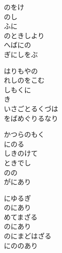 \documentclass[10pt,b5j]{tarticle} %
\begin{document}
\vspace{1.5em} %
\newcommand{\linespace}{0.5em} %
\newcommand{\blocksize}{0.5\hsize} %
\begin{enumerate} %
    \begin{minipage}[c]{\blocksize}
    
        \vspace{\linespace}
        \item
        のをけ\\
        のし\\
        ふに\\
        のときしより\\
        へばにの\\
        ぎにしをぶ
        
        \vspace{\linespace}
        \item
        はりもやの\\
        れしのをこむ\\
        しもくに\\
        き\\
        いさごとるくづは\\
        をばめぐりるなり
        
        \vspace{\linespace}
        \item
        かつらのもく\\
        にのる\\
        しきのけて\\
        ときでし\\
        のの\\
        がにあり
        
        \vspace{\linespace}
        \item
        にゆるぎ\\
        のにあり\\
        めてまざる\\
        のにあり\\
        のにまどはざる\\
        にののあり
        

\end{minipage}
\end{enumerate}
\end{document}
